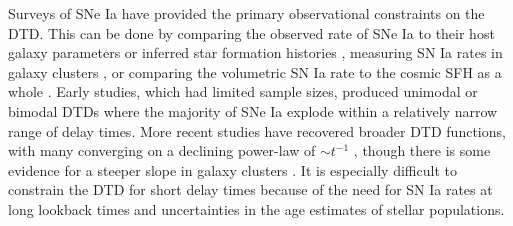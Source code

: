 \documentclass[twocolumn,twocolappendix,linenumbers,trackchanges]{aastex631}
\begin{document}
Surveys of SNe Ia have provided the primary observational constraints on the DTD.  
This can be done by comparing the observed rate of SNe Ia to their host galaxy parameters \citep[e.g.,][]{Mannucci2005-SNRate,Heringer2019-FieldGalaxyDTD} or inferred star formation histories \citep[SFHs; e.g.,][]{Maoz2012-SloanIIDTD}, measuring SN Ia rates in galaxy clusters \citep[e.g.,][]{Maoz2010-ClusterDTD}, or comparing the volumetric SN Ia rate to the cosmic SFH as a whole \citep[e.g.,][]{Graur2014-VolumetricSNIaRates,Strolger2020-ExponentialDTD}. 
Early studies, which had limited sample sizes, produced unimodal \citep{Strolger2004-SNIaProgenitors} or bimodal \citep{Mannucci2006-TwoPopulations} DTDs where the majority of SNe Ia explode within a relatively narrow range of delay times.
More recent studies have recovered broader DTD functions, with many converging on a declining power-law of $\sim t^{-1}$ \citep[e.g.,][]{Maoz2017-CosmicDTD,Castrillo2021-DTD,Wiseman2021-DESRates}, though there is some evidence for a steeper slope in galaxy clusters \citep{Maoz2017-CosmicDTD,FriedmannMaoz2018-ClusterDTD}.
It is especially difficult to constrain the DTD for short delay times \citep{MaozMannucci2012-SNeIaReview} because of the need for SN Ia rates at long lookback times and uncertainties in the age estimates of stellar populations.

\end{document}
